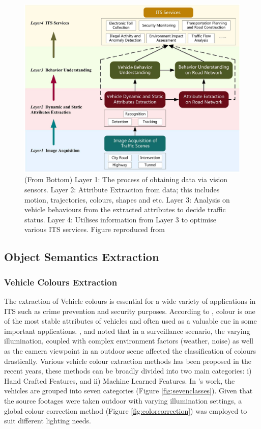 \begin{figure}[hbt!]\centering
\includegraphics[width=1\textwidth]{image/lit/ITS.png}
\caption[Overview of the General Frameworks for ITSs]{(From Bottom) Layer 1: The process of obtaining data via vision sensors. Layer 2: Attribute Extraction from data; this includes motion, trajectories, colours, shapes and etc. Layer 3: Analysis on vehicle behaviours from the extracted attributes to decide traffic status. Layer 4: Utilises information from Layer 3 to optimise various ITS services. Figure reproduced from~}
\label{fig:ITSoverview}
\end{figure}




\subsection{Object Semantics Extraction}

\subsubsection{Vehicle Colours Extraction}
The extraction of Vehicle colours is essential for a wide variety of applications in ITS such as crime prevention and security purposes. 
According to , colour is one of the most stable attributes of vehicles and often used as a valuable cue in some important applications.
,  and  noted that in a surveillance scenario, the varying illumination, coupled with complex environment factors (weather, noise) as well as the camera viewpoint in an outdoor scene affected the classification of colours drastically. 
Various vehicle colour extraction methods has been proposed in the recent years, these methods can be broadly divided into two main categories: i) Hand Crafted Features, and ii) Machine Learned Features.
In 's work, the vehicles are grouped into seven categories (Figure \ref{fig:sevenclasses}). Given that the source footages were taken outdoor with varying illumination settings, a global colour correction method (Figure \ref{fig:colorcorrection}) was employed to suit different lighting needs. 

